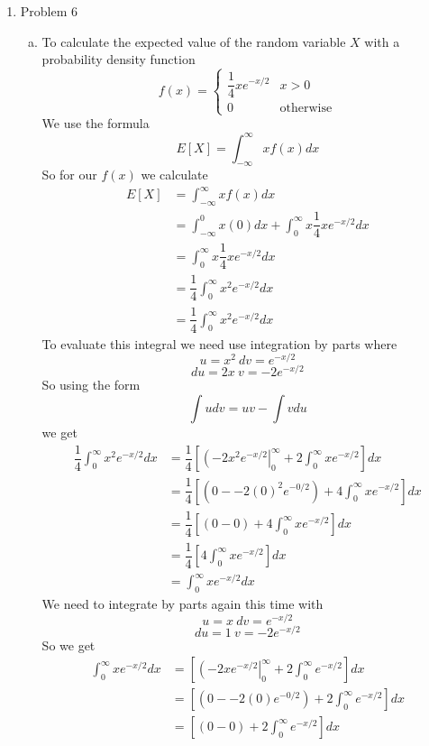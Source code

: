 \documentclass[11pt]{article}
\begin{document}
\begin{enumerate}
\item Problem 6
\begin{enumerate}[(a)]
\item
To calculate the expected value of the random variable $X$ with a probability density function 
$$f(x) = \left\{\begin{array}{lc}
		\dfrac{1}{4}xe^{-x/2} &x>0\\
		0	& \mbox{otherwise}
		\end{array}\right.$$
We use the formula 
\begin{equation}
E[X] = \int_{-\infty}^{\infty}xf(x)dx
\label{exp}
\end{equation}
So for our $f(x)$ we calculate 
\begin{align*}
E[X] &= \int_{-\infty}^{\infty}xf(x)dx\\
 &= \int_{-\infty}^{0}x(0)dx + \int_{0}^{\infty}x\dfrac{1}{4}xe^{-x/2} dx\\
 &=\int_{0}^{\infty}x\dfrac{1}{4}xe^{-x/2} dx\\
 &=\dfrac{1}{4}\int_{0}^{\infty}x^2e^{-x/2} dx\\
 &=\dfrac{1}{4}\int_{0}^{\infty}x^2e^{-x/2} dx
\end{align*}
To evaluate this integral we need use integration by parts where
$$u = x^2\  dv = e^{-x/2}$$
$$du = 2x\  v = -2e^{-x/2}$$
So using the form
$$\int udv = uv - \int vdu$$
we get
\begin{align*}
\dfrac{1}{4}\int_{0}^{\infty}x^2e^{-x/2} dx &=\dfrac{1}{4}\left[\left(-2x^2e^{-x/2}\right|_{0}^{\infty} + 2\int_{0}^{\infty}xe^{-x/2}\right] dx\\
&=\dfrac{1}{4}\left[\left(0--2(0)^2e^{-0/2}\right)+ 4\int_{0}^{\infty}xe^{-x/2}\right] dx\\
&=\dfrac{1}{4}\left[\left(0-0\right)+ 4\int_{0}^{\infty}xe^{-x/2}\right] dx\\
&=\dfrac{1}{4}\left[4\int_{0}^{\infty}xe^{-x/2}\right] dx\\
&=\int_{0}^{\infty}xe^{-x/2}dx
\end{align*}
We need to integrate by parts again this time with
$$u = x\  dv = e^{-x/2}$$
$$du = 1\  v = -2e^{-x/2}$$
So we get
\begin{align*}
\int_{0}^{\infty}xe^{-x/2} dx &=\left[\left(-2xe^{-x/2}\right|_{0}^{\infty} + 2\int_{0}^{\infty}e^{-x/2}\right] dx\\
&=\left[\left(0--2(0)e^{-0/2}\right)+ 2\int_{0}^{\infty}e^{-x/2}\right] dx\\
&=\left[\left(0-0\right) + 2\int_{0}^{\infty}e^{-x/2}\right] dx\\

\end{align*}
\end{enumerate}
\end{enumerate}
\end{document}
